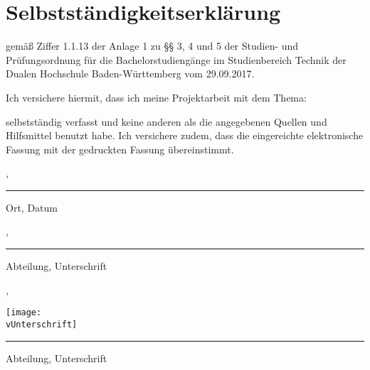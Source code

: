 \thispagestyle{empty}
\section*{\Huge{Selbstständigkeitserklärung}}

gemäß Ziffer 1.1.13 der Anlage 1 zu §§ 3, 4 und 5  der Studien- und Prüfungsordnung für die Bachelorstudiengänge im Studienbereich Technik der Dualen Hochschule Baden-Würt­tem­berg vom 29.09.2017.

\noindent Ich versichere hiermit, dass ich meine Projektarbeit mit dem Thema: 
\begin{center}
	\Large\textbf{\vTitel}
\end{center}
selbstständig verfasst und keine anderen als die angegebenen Quellen und Hilfsmittel benutzt habe. Ich versichere zudem, dass die eingereichte elektronische Fassung mit der gedruckten Fassung übereinstimmt.

\vfill
\leavevmode
\newline
\parbox{6cm}{\strut\centering \vBearbeitungsort, \vAbgabedatum\hrule\strut\centering\footnotesize Ort, Datum} 
\hfill
\ifx\vUnterschrift\empty
\parbox{6cm}{\strut\hspace{1pt} \vAbteilung, \hrule\strut\centering\footnotesize Abteilung, Unterschrift}
\else
\parbox{6cm}{\strut\hspace{1pt} \vAbteilung, \parbox[b]{3cm}{\vspace{-10cm}\texttt{[image: \\vUnterschrift]}}\hrule\strut\centering\footnotesize Abteilung, Unterschrift}
\fi
\vspace{1cm}

\newpage